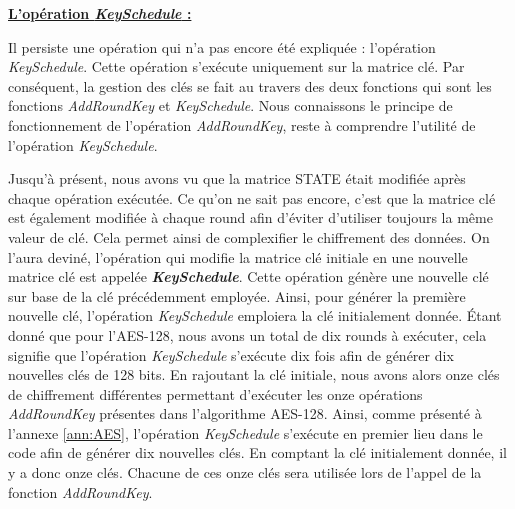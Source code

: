 \documentclass[oneside]{book}
\begin{document}
\newpage
\underline{\textbf{L'opération \textit{KeySchedule} :}}

\vspace{0.25cm}Il persiste une opération qui n'a pas encore été expliquée : l'opération \textit{KeySchedule}. Cette opération s'exécute uniquement sur la matrice clé. Par conséquent, la gestion des clés se fait au travers des deux fonctions qui sont les fonctions \textit{AddRoundKey} et \textit{KeySchedule}. Nous connaissons le principe de fonctionnement de l'opération \textit{AddRoundKey}, reste à comprendre l'utilité de l'opération \textit{KeySchedule}.

\hspace{-0.5cm}Jusqu'à présent, nous avons vu que la matrice STATE était modifiée après chaque opération exécutée. Ce qu'on ne sait pas encore, c'est que la matrice clé est également modifiée à chaque round afin d'éviter d'utiliser toujours la même valeur de clé. Cela permet ainsi de complexifier le chiffrement des données. On l'aura deviné, l'opération qui modifie la matrice clé initiale en une nouvelle matrice clé est appelée \textbf{\textit{KeySchedule}}. Cette opération génère une nouvelle clé sur base de la clé précédemment employée. Ainsi, pour générer la première nouvelle clé, l'opération \textit{KeySchedule} emploiera la clé initialement donnée. Étant donné que pour l'AES-128, nous avons un total de dix rounds à exécuter, cela signifie que l'opération \textit{KeySchedule} s'exécute dix fois afin de générer dix nouvelles clés de 128 bits. En rajoutant la clé initiale, nous avons alors onze clés de chiffrement différentes permettant d'exécuter les onze opérations \textit{AddRoundKey} présentes dans l'algorithme AES-128. Ainsi, comme présenté à l'annexe \ref{ann:AES}, l'opération \textit{KeySchedule} s'exécute en premier lieu dans le code afin de générer dix nouvelles clés. En comptant la clé initialement donnée, il y a donc onze clés. Chacune de ces onze clés sera utilisée lors de l'appel de la fonction \textit{AddRoundKey}. 
\end{document}
